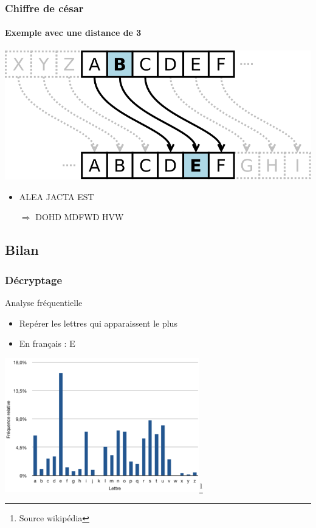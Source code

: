 \documentclass[xcolor={dvipsnames}]{beamer}
\begin{document}
\begin{frame}
\frametitle{Chiffre de césar}
\framesubtitle{Exemple avec une distance de 3}


	\begin{center}
		\includegraphics[scale=0.2]{cesar}			
	\end{center}

\begin{itemize}
	\item ALEA JACTA EST\pause
	\item[$\Rightarrow$] DOHD MDFWD HVW
\end{itemize}


\end{frame}





\subsection{Bilan}

\begin{frame}
\frametitle{Décryptage}

\begin{block}{Analyse fréquentielle}
	\begin{itemize}
		\item Repérer les lettres qui apparaissent le plus
		\item En français : E
	\end{itemize}
\end{block}

\begin{center}
	\includegraphics[scale=0.6]{freq}\footnote{Source wikipédia}
\end{center}	

\end{frame}
\end{document}
